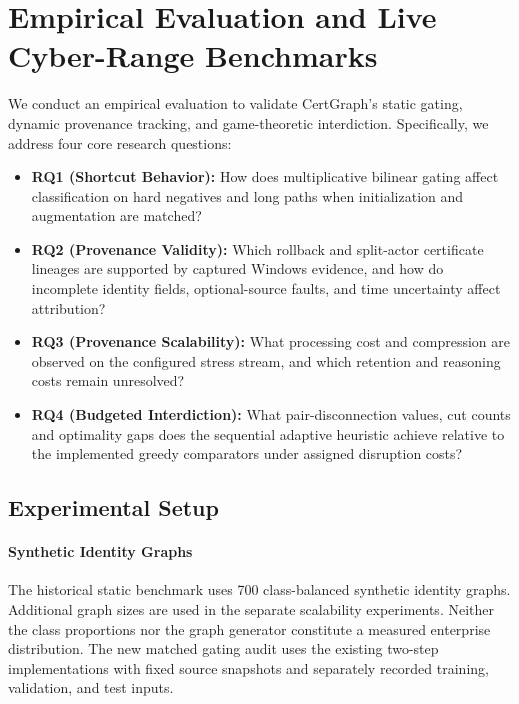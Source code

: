 \section{Empirical Evaluation and Live Cyber-Range Benchmarks}
\label{sec:evaluation}

We conduct an empirical evaluation to validate CertGraph's static gating, dynamic provenance tracking, and game-theoretic interdiction. Specifically, we address four core research questions:
\begin{itemize}
    \item \textbf{RQ1 (Shortcut Behavior):} How does multiplicative bilinear gating affect classification on hard negatives and long paths when initialization and augmentation are matched?
    \item \textbf{RQ2 (Provenance Validity):} Which rollback and split-actor certificate lineages are supported by captured Windows evidence, and how do incomplete identity fields, optional-source faults, and time uncertainty affect attribution?
    \item \textbf{RQ3 (Provenance Scalability):} What processing cost and compression are observed on the configured stress stream, and which retention and reasoning costs remain unresolved?
    \item \textbf{RQ4 (Budgeted Interdiction):} What pair-disconnection values, cut counts and optimality gaps does the sequential adaptive heuristic achieve relative to the implemented greedy comparators under assigned disruption costs?
\end{itemize}

\subsection{Experimental Setup}
\paragraph{Synthetic Identity Graphs} The historical static benchmark uses 700 class-balanced synthetic identity graphs. Additional graph sizes are used in the separate scalability experiments. Neither the class proportions nor the graph generator constitute a measured enterprise distribution. The new matched gating audit uses the existing two-step implementations with fixed source snapshots and separately recorded training, validation, and test inputs.

